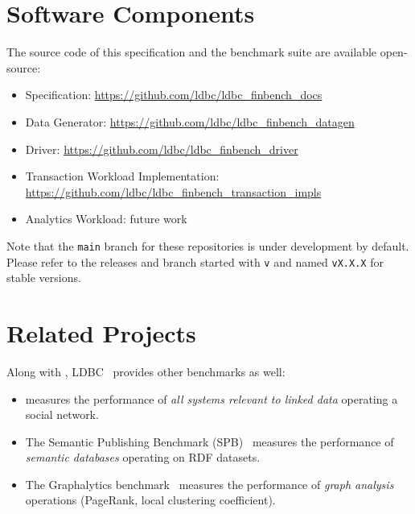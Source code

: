 
\section{Software Components}

The source code of this specification and the benchmark suite are available
open-source:
\begin{itemize}
      \item \ldbcfinbench Specification: \url{https://github.com/ldbc/ldbc_finbench_docs}
      \item \ldbcfinbench Data Generator: \url{https://github.com/ldbc/ldbc_finbench_datagen}
      \item \ldbcfinbench Driver: \url{https://github.com/ldbc/ldbc_finbench_driver}
      \item Transaction Workload Implementation: \url{https://github.com/ldbc/ldbc_finbench_transaction_impls}
      \item Analytics Workload: future work
\end{itemize}

Note that the \texttt{main} branch for these repositories is under development
by default. Please refer to the releases and branch started with \texttt{v} and
named \texttt{vX.X.X} for stable versions.


\section{Related Projects}

Along with \ldbcfinbench, LDBC~\cite{DBLP:journals/sigmod/AnglesBLF0ENMKT14}
provides other benchmarks as well:

\begin{itemize}
      \item \ldbcsnb measures the performance of \emph{all systems relevant to
                  linked data} operating a social network.
      \item The Semantic Publishing Benchmark
            (SPB)~\cite{DBLP:conf/semweb/SpasicJP16} measures the performance of
            \emph{semantic databases} operating on RDF datasets.
      \item The Graphalytics
            benchmark~\cite{DBLP:journals/pvldb/IosupHNHPMCCSAT16} measures the
            performance of \emph{graph analysis} operations (\eg PageRank, local
            clustering coefficient).
\end{itemize}